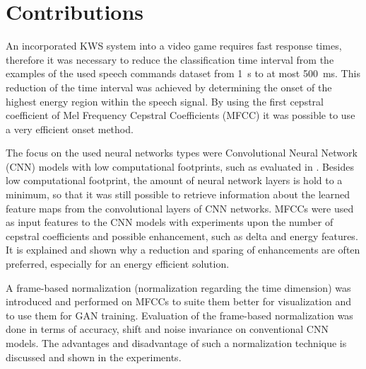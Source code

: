 
\section{Contributions}
\thesisStateRevised
An incorporated KWS system into a video game requires fast response times, therefore it was necessary to reduce the classification time interval from the examples of the used speech commands dataset \cite{Warden2018} from \SI{1}{\second} to at most \SI{500}{\milli\second}.
This reduction of the time interval was achieved by determining the onset of the highest energy region within the speech signal.
By using the first cepstral coefficient of Mel Frequency Cepstral Coefficients (MFCC) it was possible to use a very efficient onset method.

The focus on the used neural networks types were Convolutional Neural Network (CNN) models with low computational footprints, such as evaluated in \cite{Sainath2015}.
Besides low computational footprint, the amount of neural network layers is hold to a minimum, so that it was still possible to retrieve information about the learned feature maps from the convolutional layers of CNN networks.
MFCCs were used as input features to the CNN models with experiments upon the number of cepstral coefficients and possible enhancement, such as delta and energy features.
It is explained and shown why a reduction and sparing of enhancements are often preferred, especially for an energy efficient solution.

A frame-based normalization (normalization regarding the time dimension) was introduced and performed on MFCCs to suite them better for visualization and to use them for GAN training.
Evaluation of the frame-based normalization was done in terms of accuracy, shift and noise invariance on conventional CNN models.
The advantages and disadvantage of such a normalization technique is discussed and shown in the experiments.

